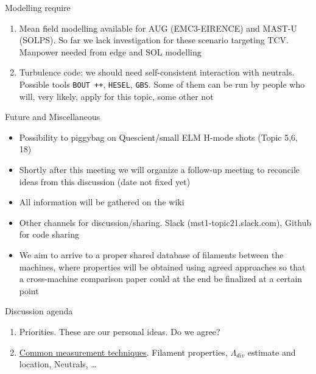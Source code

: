 \documentclass[10pt, compress]{beamer}
\begin{document}
\begin{frame}{Modelling require}
  \begin{enumerate}
    \item Mean field modelling available for AUG (EMC3-EIRENCE) and
      MAST-U (SOLPS). So far we lack investigation for these scenario
      targeting TCV. Manpower needed from edge and SOL modelling
    \item Turbulence code: we should need self-consistent interaction
      with neutrals. Possible tools \texttt{BOUT ++}, \texttt{HESEL},
      \texttt{GBS}. Some of them can be run by people who will, very
      likely, apply for this topic, some other not
  \end{enumerate}
\end{frame}

\begin{frame}{Future and Miscellaneous}
	\begin{itemize}
		\item Possibility to piggybag on Quescient/small ELM H-mode shots (Topic 5,6, 18)
		\item Shortly after this meeting we will organize a follow-up meeting to reconcile ideas
                  from this discussion (date not fixed yet)
		\item All information will be gathered on the wiki
                \item Other channels for discussion/sharing. Slack
                  (mst1-topic21.slack.com), Github for code sharing
		\item We aim to arrive to a proper shared database of
                  filaments between the machines, where properties
                  will be obtained using agreed approaches so that a
                  cross-machine comparison paper could at the end be
                  finalized at a certain point		
	\end{itemize}
\end{frame}

\begin{frame}{Discussion agenda}
	\begin{enumerate}
		\item Priorities. These are our personal ideas. Do we agree? 
		\item \underline{Common measurement techniques}. Filament
                  properties, $\Lambda_{div}$ estimate and location,
                  Neutrals, \ldots 
 	\end{enumerate}
\end{frame}
\end{document}
